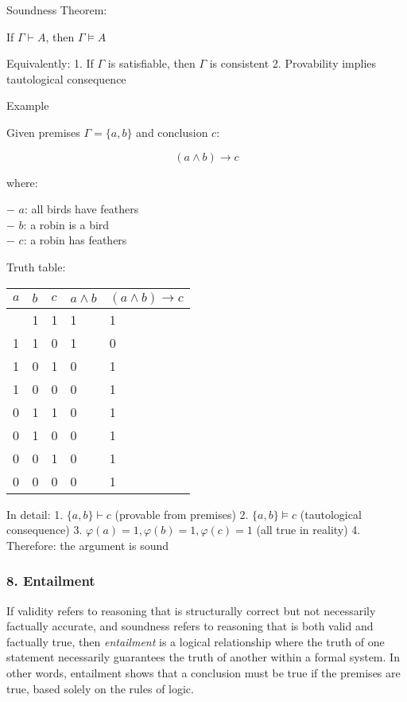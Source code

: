 Soundness Theorem:

If \(\Gamma \vdash A\), then \(\Gamma \models A\)

Equivalently: 1. If \(\Gamma\) is satisfiable, then \(\Gamma\) is
consistent 2. Provability implies tautological consequence

Example

Given premises \(\Gamma = \{a, b\}\) and conclusion \(c\):

\[(a \land b) \to c\]

where:

− \(a\): all birds have feathers\\
− \(b\): a robin is a bird\\
− \(c\): a robin has feathers

Truth table:

\begin{longtable}[]{@{}lllll@{}}
\toprule\noalign{}
\(a\) & \(b\) & \(c\) & \(a \land b\) & \((a \land b) \to c\) \\
\midrule\noalign{}
\endhead
\bottomrule\noalign{}
\endlastfoot
1 & 1 & 1 & 1 & 1 \\
1 & 1 & 0 & 1 & 0 \\
1 & 0 & 1 & 0 & 1 \\
1 & 0 & 0 & 0 & 1 \\
0 & 1 & 1 & 0 & 1 \\
0 & 1 & 0 & 0 & 1 \\
0 & 0 & 1 & 0 & 1 \\
0 & 0 & 0 & 0 & 1 \\
\end{longtable}

In detail: 1. \(\{a, b\} \vdash c\) (provable from premises) 2.
\(\{a, b\} \models c\) (tautological consequence) 3.
\(\varphi(a) = 1, \varphi(b) = 1, \varphi(c) = 1\) (all true in reality)
4. Therefore: the argument is sound

\subsubsection{8. Entailment}\label{entailment}

If validity refers to reasoning that is structurally correct but not
necessarily factually accurate, and soundness refers to reasoning that
is both valid and factually true, then \emph{entailment} is a logical
relationship where the truth of one statement necessarily guarantees the
truth of another within a formal system. In other words, entailment
shows that a conclusion must be true if the premises are true, based
solely on the rules of logic.


